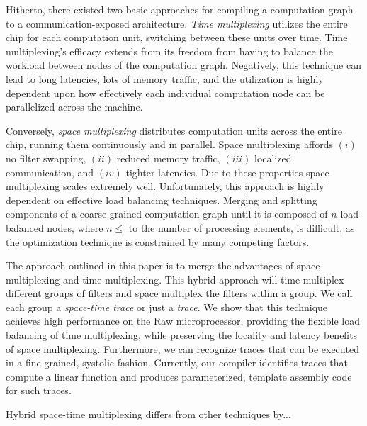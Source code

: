 Hitherto, there existed two basic approaches for compiling a
computation graph to a communication-exposed architecture.  
{\it Time multiplexing} utilizes the entire chip for each computation unit,
switching between these units over time.  Time multiplexing's efficacy
extends from its freedom from having to balance the workload between
nodes of the computation graph.  Negatively, this technique can lead
to long latencies, lots of memory traffic, and the utilization is
highly dependent upon how effectively each individual computation node
can be parallelized across the machine.

Conversely, {\it space multiplexing} distributes computation units
across the entire chip, running them continuously and in parallel.
Space multiplexing affords $(i)$ no filter swapping, $(ii)$ reduced
memory traffic, $(iii)$ localized communication, and $(iv)$ tighter
latencies.  Due to these properties space multiplexing scales
extremely well.  Unfortunately, this approach is highly dependent on
effective load balancing techniques.  Merging and splitting components
of a coarse-grained computation graph until it is composed of $n$ load
balanced nodes, where $n \le$ to the number of processing elements, is
difficult, as the optimization technique is constrained by many
competing factors.

The approach outlined in this paper is to merge the advantages of
space multiplexing and time multiplexing.  This hybrid approach will
time multiplex different groups of filters and space multiplex the
filters within a group.  We call each group a {\it space-time trace}
or just a {\it trace}.  We show that this technique achieves high
performance on the Raw microprocessor, providing the flexible load
balancing of time multiplexing, while preserving the locality and
latency benefits of space multiplexing.  Furthermore, we can recognize
traces that can be executed in a fine-grained, systolic fashion.
Currently, our compiler identifies traces that compute a linear
function and produces parameterized, template assembly code for such
traces.

Hybrid space-time multiplexing differs from other techniques by...

